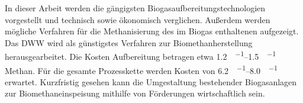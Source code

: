 
In dieser Arbeit werden die gängigsten Biogasaufbereitungstechnologien vorgestellt und technisch sowie ökonomisch verglichen. Außerdem werden mögliche Verfahren für die Methanisierung des im Biogas enthaltenen  aufgezeigt. \newline
Das \gls{DWW} wird als günstigstes Verfahren zur Biomethanherstellung herausgearbeitet. Die Kosten Aufbereitung betragen etwa \SIrange{1,2}{1,5}{\ct\per\kwh} Methan. Für die gesamte Prozesskette werden Kosten von \SIrange{6,2}{8,0}{\ct\per\kwh} erwartet. \newline
Kurzfristig gesehen kann die Umgestaltung bestehender Biogasanlagen zur Biomethaneinspeisung mithilfe von Förderungen wirtschaftlich sein.

